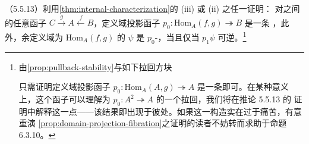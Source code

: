 \begin{exercise}\label{ex:cospan-domain-projection-fibration}
（5.5.13）利用\cref{thm:internal-characterization}的 (iii) 或 (ii) 之任一证明：
对\trInfinityCategory{}之间的任意函子\trCospan{}
$C\xrightarrow{g}A\xleftarrow{f}B$，定义域投影函子
$p_{0}\colon\mathrm{Hom}_{A}(f,g)\twoheadrightarrow B$ 是一条%
\trCartesianFibration，此外，余定义域为 $\mathrm{Hom}_{A}(f,g)$ 的%
\trNaturalTransformation{} $\psi$ 是 $p_{0}$-\trCartesian，当且仅当
$p_{1}\psi$ 可逆。\footnote{由\cref{prop:pullback-stability}与如下拉回方块
\begin{center}
\end{center}
只需证明定义域投影函子 $p_{0}\colon\mathrm{Hom}_{A}(A,g)\twoheadrightarrow A$
是一条\trCartesianFibration{}即可。在某种意义上，这个函子可以理解为
$p_{0}\colon A^{2}\twoheadrightarrow A$ 的一个拉回，我们将在推论 5.5.13 的
证明中解释这一点——该结果即出现于彼处。如果这一构造实在过于痛苦，有意重演%
\cref{prop:domain-projection-fibration}之证明的读者不妨转而求助于命题 6.3.10。}
\end{exercise}



